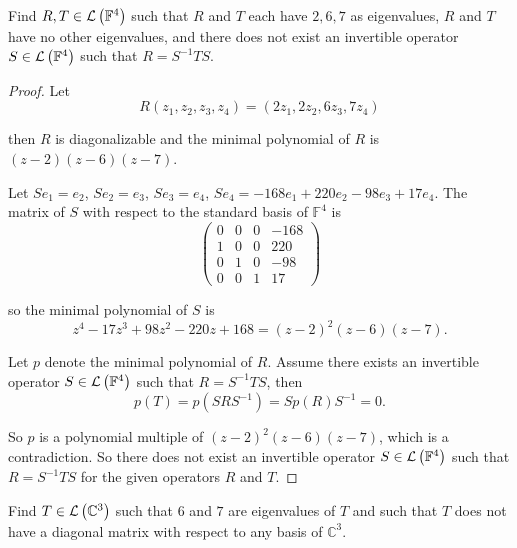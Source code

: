 \begin{exercise}
    Find $R, T\in \mathcal{L}\left({\mathbb{F}^{4}}\right)$ such that $R$ and $T$ each have $2, 6, 7$ as eigenvalues, $R$ and $T$ have no other eigenvalues, and there does not exist an invertible operator $S\in\mathcal{L}\left({\mathbb{F}^{4}}\right)$ such that $R = S^{-1}TS$.
\end{exercise}

\begin{proof}
    Let
    \[
        R(z_{1}, z_{2}, z_{3}, z_{4}) = (2z_{1}, 2z_{2}, 6z_{3}, 7z_{4})
    \]

    then $R$ is diagonalizable and the minimal polynomial of $R$ is $(z - 2)(z - 6)(z - 7)$.

    Let $Se_{1} = e_{2}$, $Se_{2} = e_{3}$, $Se_{3} = e_{4}$, $Se_{4} = -168e_{1} + 220e_{2} - 98e_{3} + 17e_{4}$. The matrix of $S$ with respect to the standard basis of $\mathbb{F}^{4}$ is
    \[
        \begin{pmatrix}
            0 & 0 & 0 & -168 \\
            1 & 0 & 0 & 220  \\
            0 & 1 & 0 & -98  \\
            0 & 0 & 1 & 17
        \end{pmatrix}
    \]

    so the minimal polynomial of $S$ is
    \[
        z^{4} - 17z^{3} + 98z^{2} - 220z + 168 = {(z - 2)}^{2}(z - 6)(z - 7).
    \]

    Let $p$ denote the minimal polynomial of $R$. Assume there exists an invertible operator $S\in\mathcal{L}\left({\mathbb{F}^{4}}\right)$ such that $R = S^{-1}TS$, then
    \[
        p(T) = p(SRS^{-1}) = Sp(R)S^{-1} = 0.
    \]

    So $p$ is a polynomial multiple of ${(z - 2)}^{2}(z - 6)(z - 7)$, which is a contradiction. So there does not exist an invertible operator $S\in\mathcal{L}\left({\mathbb{F}^{4}}\right)$ such that $R = S^{-1}TS$ for the given operators $R$ and $T$.
\end{proof}
\newpage

\begin{exercise}
    Find $T\in\mathcal{L}\left({\mathbb{C}^{3}}\right)$ such that $6$ and $7$ are eigenvalues of $T$ and such that $T$ does not have a diagonal matrix with respect to any basis of $\mathbb{C}^{3}$.
\end{exercise}

